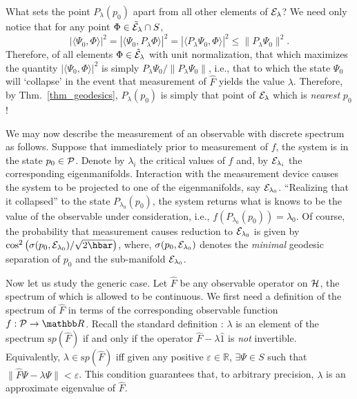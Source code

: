 \documentclass[12pt,aps,eqsecnum,tighten,nofootinbib]{revtex4-2}
\def\be{\begin{equation}}
\def\ee{\end{equation}}
\def\<{\langle}
\def\>{\rangle}
\def\H{{\cal H}}
\def\P{{\cal P}}
\def\Bbb{}
\def\R{\mathbb R}
\begin{document}
What sets the point ${\Bbb P}_\lambda(p_0)$ apart from all other
elements of  ${\cal E}_\lambda$?  We need only notice that for any
point  $\Phi \in \tilde{\cal E}_\lambda \cap S$,
%
\be\label{projection-ineq}
\left| \< \Psi_0, \Phi \> \right|^2 =
\left| \< \Psi_0, {\Bbb P}_\lambda \Phi \> \right|^2 =
\left| \< {\Bbb P}_\lambda \Psi_0, \Phi \> \right|^2 \le
\| {\Bbb P}_\lambda \Psi_0 \|^2.
\ee
%
Therefore, of all elements $\Phi \in \tilde{\cal E}_\lambda$ with unit
normalization, that which maximizes the quantity $|\<
\Psi_0,\Phi\>|^2$ is simply ${\Bbb P}_\lambda \Psi_0 / \| {\Bbb
P}_\lambda \Psi_0 \|$, i.e., that to which the state $\Psi_0$ will
`collapse' in the event that measurement of $\hat{F}$ yields the value
$\lambda$.  Therefore, by Thm.~\ref{thm_geodesics}, ${\Bbb
P}_\lambda(p_0)$ is simply that point of ${\cal E}_\lambda$ which is
{\em nearest} $p_0$!

We may now describe the measurement of an observable with discrete
spectrum as follows.  Suppose that immediately prior to measurement of
$f$, the system is in the state $p_0 \in \P$.  Denote by $\lambda_i$
the critical values of $f$ and, by ${\cal E}_{\lambda_i}$ the
corresponding eigenmanifolds.  Interaction with the measurement device
causes the system to be projected to one of the eigenmanifolds, say
${\cal E}_{\lambda_0}$.  ``Realizing that it collapsed'' to the state
${\Bbb P}_{\lambda_0}(p_0)$, the system returns what is knows to be
the value of the observable under consideration, i.e., $f\left( {\Bbb
P}_{\lambda_0}(p_0)\right) = \lambda_0$.  Of course, the probability
that measurement causes reduction to ${\cal E}_{\lambda_0}$ is given
by $\cos^2 \left( \sigma(p_0,{\cal E}_{\lambda_0}) / \sqrt{2\hbar}
\right)$, where, $\sigma(p_0,{\cal E}_{\lambda_0})$ denotes the {\em
minimal} geodesic separation of $p_0$ and the sub-manifold ${\cal
E}_{\lambda_0}$.

Now let us study the generic case.  Let $\hat{F}$ be any observable
operator on $\H$, the spectrum of which is allowed to be continuous.
We first need a definition of the spectrum of $\hat{F}$ in terms of
the corresponding observable function $f:\P\rightarrow\R$.  Recall the
standard definition \cite{reed-simon}: $\lambda$ is an element of the
spectrum ${\mathrm sp}(\hat{F})$ if and only if the operator $\hat{F}
- \lambda\hat{1}$ is {\em not} invertible.  Equivalently, $\lambda \in
{\mathrm sp}(\hat{F})$ iff given any positive $\varepsilon\in\R$,
$\exists \Psi\in S$ such that $\| \hat{F}\Psi - \lambda\Psi \| <
\varepsilon$.  This condition guarantees that, to arbitrary precision,
$\lambda$ is an approximate eigenvalue of $\hat{F}$.
\end{document}
